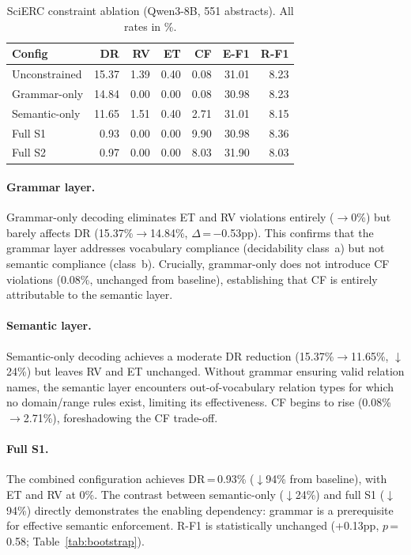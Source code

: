 \documentclass[11pt,a4paper]{article}
\begin{document}
\begin{table}[t]
\centering
\caption{SciERC constraint ablation (Qwen3-8B, 551 abstracts). All rates in \%.}
\label{tab:scierc_ablation}
\small
\begin{tabular}{lrrrrrr}
\toprule
\textbf{Config} & \textbf{DR} & \textbf{RV} & \textbf{ET} & \textbf{CF} & \textbf{E-F1} & \textbf{R-F1} \\
\midrule
Unconstrained   & 15.37 & 1.39 & 0.40 & 0.08 & 31.01 & 8.23 \\
Grammar-only    & 14.84 & 0.00 & 0.00 & 0.08 & 30.98 & 8.23 \\
Semantic-only   & 11.65 & 1.51 & 0.40 & 2.71 & 31.01 & 8.15 \\
Full S1         &  0.93 & 0.00 & 0.00 & 9.90 & 30.98 & 8.36 \\
Full S2         &  0.97 & 0.00 & 0.00 & 8.03 & 31.90 & 8.03 \\
\bottomrule
\end{tabular}
\end{table}

\paragraph{Grammar layer.}
Grammar-only decoding eliminates ET and RV violations entirely ($\to$0\%) but barely affects DR (15.37\%$\to$14.84\%, $\Delta$\,=\,$-$0.53pp).
This confirms that the grammar layer addresses vocabulary compliance (decidability class~a) but not semantic compliance (class~b).
Crucially, grammar-only does not introduce CF violations (0.08\%, unchanged from baseline), establishing that CF is entirely attributable to the semantic layer.

\paragraph{Semantic layer.}
Semantic-only decoding achieves a moderate DR reduction (15.37\%$\to$11.65\%, $\downarrow$24\%) but leaves RV and ET unchanged.
Without grammar ensuring valid relation names, the semantic layer encounters out-of-vocabulary relation types for which no domain/range rules exist, limiting its effectiveness.
CF begins to rise (0.08\%$\to$2.71\%), foreshadowing the CF trade-off.

\paragraph{Full S1.}
The combined configuration achieves DR\,=\,0.93\% ($\downarrow$94\% from baseline), with ET and RV at 0\%.
The contrast between semantic-only ($\downarrow$24\%) and full S1 ($\downarrow$94\%) directly demonstrates the enabling dependency: grammar is a prerequisite for effective semantic enforcement.
R-F1 is statistically unchanged (+0.13pp, $p$\,=\,0.58; Table~\ref{tab:bootstrap}).
\end{document}
